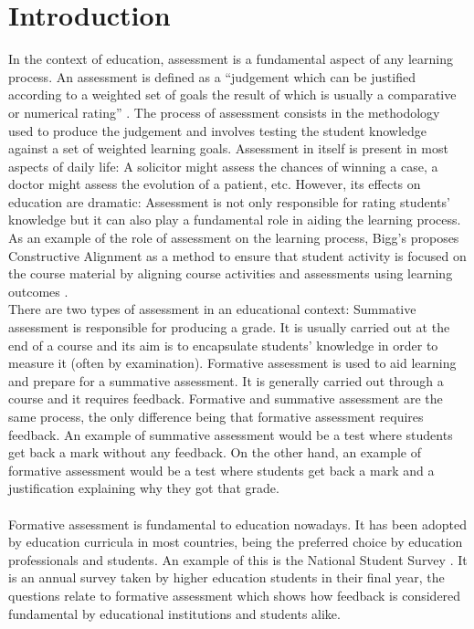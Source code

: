 \documentclass[11pt, oneside]{article}   	%
\begin{document}
\section{Introduction}
In the context of education, assessment is a fundamental aspect of any learning process. An assessment is defined as a ``judgement which can be justified according to a weighted set of goals the result of which is usually a comparative or numerical rating'' \cite{Scriven1967}. The process of assessment consists in the methodology used to produce the judgement and involves testing the student knowledge against a set of weighted learning goals. Assessment in itself is present in most aspects of daily life: A solicitor might assess the chances of winning a case, a doctor might assess the evolution of a patient, etc. However, its effects on education are dramatic: Assessment is not only responsible for rating students' knowledge but it can also play a fundamental role in aiding the learning process. As an example of the role of assessment on the learning process, Bigg's proposes Constructive Alignment as a method to ensure that student activity is focused on the course material by aligning course activities and assessments using learning outcomes \cite{Biggs2002}.\\ 
There are two types of assessment in an educational context: Summative assessment is responsible for producing a grade. It is usually carried out at the end of a course and its aim is to encapsulate students' knowledge in order to measure it (often by examination). Formative assessment is used to aid learning and prepare for a summative assessment. It is generally carried out through a course and it requires feedback. Formative and summative assessment are the same process, the only difference being that formative assessment requires feedback. An example of summative assessment would be a test where students get back a mark without any feedback. On the other hand, an example of formative assessment would be a test where students get back a mark and a justification explaining why they got that grade.\\\\
Formative assessment is fundamental to education nowadays. %
It has been adopted by education curricula in most countries, being the preferred choice by education professionals and students. An example of this is the National Student Survey \cite{nationalStudentSurvey}. It is an annual survey taken by higher education students in their final year, the questions relate to formative assessment which shows how feedback is considered fundamental by educational institutions and students alike.\\
\end{document}
